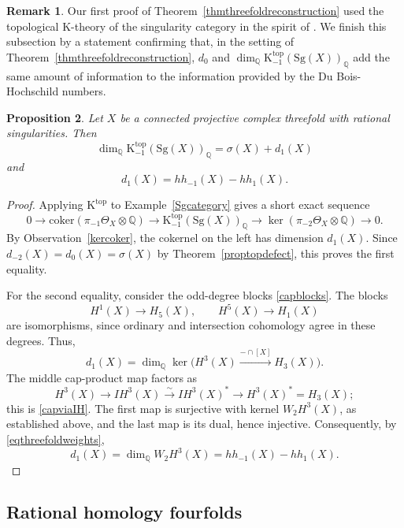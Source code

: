 \documentclass{amsart}
\theoremstyle{plain}
\newtheorem{prop}{Proposition}[section]
\theoremstyle{definition}
\newtheorem{remark}[prop]{Remark}
\newcommand{\bbQ}{\mathbb{Q}}
\newcommand{\coker}{\mathrm{coker}}
\newcommand{\K}{\mathrm{K}}
\newcommand{\Sg}{\mathrm{Sg}}
\begin{document}
\medskip

\begin{remark}\label{Ktopsgvstopdefect}
    Our first proof of Theorem~\ref{thmthreefoldreconstruction} used the topological K-theory of the singularity category in the spirit of \cite{KPS21, PS21}. We finish this subsection by a statement confirming that, in the setting of Theorem~\ref{thmthreefoldreconstruction}, $d_0$ and $\dim_\bbQ\K^{\mathrm{top}}_{-1}(\Sg(X))_\bbQ$ add the same amount of information to the information provided by the Du Bois-Hochschild numbers.
\end{remark} 

\begin{prop}
Let $X$ be a connected projective complex threefold with rational singularities. Then
\[\dim_{\bbQ}\K^{\mathrm{top}}_{-1}(\Sg(X))_{\bbQ} =\sigma(X)+d_1(X)\]
and
\[
d_1(X)=hh_{-1}(X)-hh_1(X).
\]
\end{prop}

\begin{proof}
Applying $\K^{\mathrm{top}}$ to Example~\ref{Sgcategory} gives a short exact sequence
\[
0\longrightarrow
\coker(\pi_{-1}\Theta_X\otimes\bbQ)
\longrightarrow
\K^{\mathrm{top}}_{-1}(\Sg(X))_\bbQ
\longrightarrow
\ker(\pi_{-2}\Theta_X\otimes\bbQ)
\longrightarrow0.
\]
By Observation~\ref{kercoker}, the cokernel on the left has dimension
$d_1(X)$. Since $d_{-2}(X)=d_0(X)=\sigma(X)$ by Theorem~\ref{proptopdefect}, this proves the first equality.

For the second equality, consider the odd-degree blocks
\eqref{capblocks}. The blocks
\[
H^1(X)\longrightarrow H_5(X),
\qquad
H^5(X)\longrightarrow H_1(X)
\]
are isomorphisms, since ordinary and intersection cohomology agree in these degrees. Thus,
\[
d_1(X)=
\dim_\bbQ\ker\bigl(H^3(X)\xrightarrow{-\cap[X]}H_3(X)\bigr).
\]
The middle cap-product map factors as
\[
H^3(X)\longrightarrow IH^3(X)
\xrightarrow{\sim}IH^3(X)^*
\longrightarrow H^3(X)^*=H_3(X);
\]
this is \eqref{capviaIH}.
The first map is surjective with kernel $W_2H^3(X)$, as established above, and the last map is its dual, hence injective. Consequently, by \eqref{eqthreefoldweights},
\[
d_1(X)=\dim_\bbQ W_2H^3(X)
=hh_{-1}(X)-hh_1(X).
\]
\end{proof}

\subsection{Rational homology fourfolds}
\end{document}
